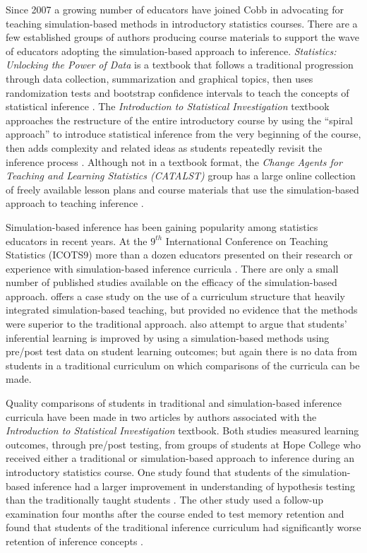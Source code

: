 \documentclass[11pt]{isuthesis}
\begin{document}
Since 2007 a growing number of educators have joined Cobb in advocating for teaching simulation-based methods in introductory statistics courses. There are a few established groups of authors producing course materials to support the wave of educators adopting the simulation-based approach to inference. \textit{Statistics: Unlocking the Power of Data} is a textbook that follows a traditional progression through data collection, summarization and graphical topics, then uses randomization tests and bootstrap confidence intervals to teach the concepts of statistical inference \citep{Lock5}. The \textit{Introduction to Statistical Investigation} textbook approaches the restructure of the entire introductory course by using the ``spiral approach'' to introduce statistical inference from the very beginning of the course, then adds complexity and related ideas as students repeatedly revisit the inference process \citep{ISI}. Although not in a textbook format, the \textit{Change Agents for Teaching and Learning Statistics (CATALST)} group has a large online collection of freely available lesson plans and course materials that use the simulation-based approach to teaching inference \citep{CATALST}. 

Simulation-based inference has been gaining popularity among statistics educators in recent years.  At the $9^{th}$ International Conference on Teaching Statistics (ICOTS9) more than a dozen educators presented on their research or experience with simulation-based inference curricula \citep{ICOTS9}. There are only a small number of published studies available on the efficacy of the simulation-based approach. \citet{Carver2011} offers a case study on the use of a curriculum structure that heavily integrated simulation-based teaching, but provided no evidence that the methods were superior to the traditional approach. \citep{Budgett2013} also attempt to argue that students' inferential learning is improved by using a simulation-based methods using pre/post test data on student learning outcomes; but again there is no data from students in a traditional curriculum on which comparisons of the curricula can be made. 

Quality comparisons of students in traditional and simulation-based inference curricula have been made in two articles by authors associated with the \textit{Introduction to Statistical Investigation} textbook. Both studies measured learning outcomes, through pre/post testing, from groups of students at Hope College who received either a traditional or simulation-based approach to inference during an introductory statistics course. One study found that students of the simulation-based inference had a larger improvement in understanding of hypothesis testing than the traditionally taught students \citep{Tintle2011}. The other study used a follow-up examination four months after the course ended to test memory retention and found that students of the traditional inference curriculum had significantly worse retention of inference concepts \citep{Tintle2012}. 
\end{document}
